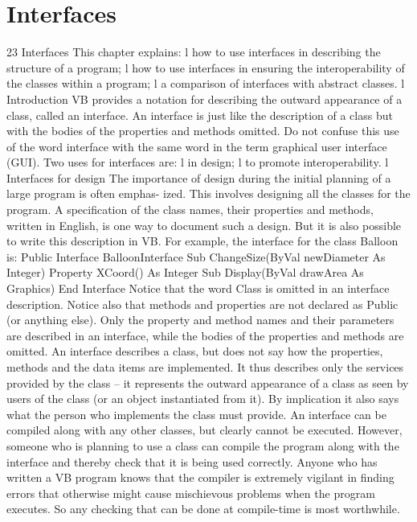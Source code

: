 \chapter{Interfaces}

23
Interfaces
This chapter explains:
l	how to use interfaces in describing the structure of a program;
l	how to use interfaces in ensuring the interoperability of the classes within a program;
l	a comparison of interfaces with abstract classes.
l Introduction
VB provides a notation for describing the outward appearance of a class, called an 
interface. An interface is just like the description of a class but with the bodies of 
the properties and methods omitted. Do not confuse this use of the word interface 
with the same word in the term graphical user interface (GUI). Two uses for interfaces 
are:
l	in design;
l	to promote interoperability.
l Interfaces for design
The importance of design during the initial planning of a large program is often emphas-
ized. This involves designing all the classes for the program. A speciﬁcation of the class names, their properties and methods, written in English, is one way to document such a design. But it is also possible to write this description in VB. For example, the interface for the class Balloon is:
Public Interface BalloonInterface
	Sub ChangeSize(ByVal newDiameter As Integer)
	Property XCoord() As Integer
	Sub Display(ByVal drawArea As Graphics)
End Interface
Notice that the word Class is omitted in an interface description. Notice also that methods and properties are not declared as Public (or anything else).
Only the property and method names and their parameters are described in an interface, while the bodies of the properties and methods are omitted. An interface describes 
a class, but does not say how the properties, methods and the data items are implemented. It thus describes only the services provided by the class – it represents the 
outward appearance of a class as seen by users of the class (or an object instantiated 
from it). By implication it also says what the person who implements the class must 
provide.
An interface can be compiled along with any other classes, but clearly cannot be 
executed. However, someone who is planning to use a class can compile the program along with the interface and thereby check that it is being used correctly. Anyone who has written a VB program knows that the compiler is extremely vigilant in ﬁnding errors that otherwise might cause mischievous problems when the program executes. So any checking that can be done at compile-time is most worthwhile.
